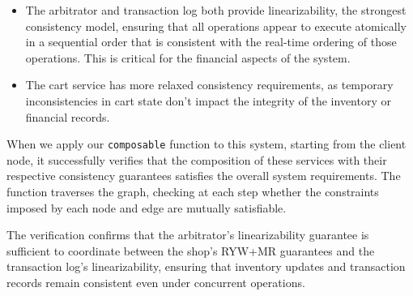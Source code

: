 {\begin{itemize}
    \item The arbitrator and transaction log both provide
      linearizability, the strongest consistency model, ensuring that
      all operations appear to execute atomically in a sequential order
      that is consistent with the real-time ordering of those
      operations. This is critical for the financial aspects of the system.

    \item The cart service has more relaxed consistency requirements,
      as temporary inconsistencies in cart state don't impact the
      integrity of the inventory or financial records.
  \end{itemize}

  When we apply our \texttt{composable} function to this system,
  starting from the client node, it successfully verifies that the
  composition of these services with their respective consistency
  guarantees satisfies the overall system requirements. The function
  traverses the graph, checking at each step whether the constraints
  imposed by each node and edge are mutually satisfiable.

  The verification confirms that the arbitrator's linearizability
  guarantee is sufficient to coordinate between the shop's RYW+MR
  guarantees and the transaction log's linearizability, ensuring that
  inventory updates and transaction records remain consistent even
  under concurrent operations.
}

